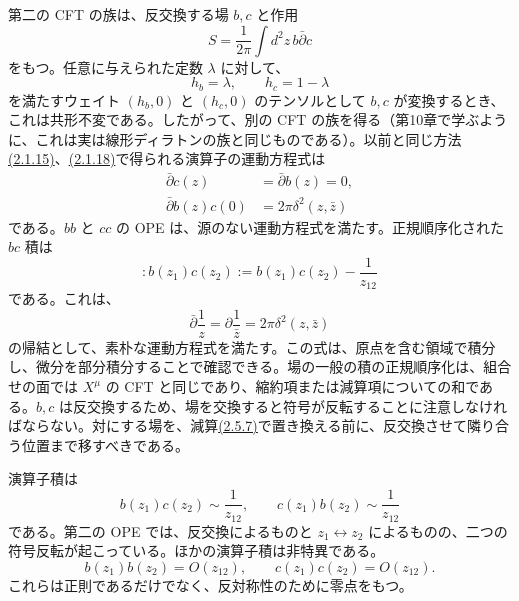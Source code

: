 第二の CFT の族は、反交換する場 $b,c$ と作用
\begin{equation}
S=\frac1{2\pi}\int d^2z\,b\bar\partial c
\tag{2.5.4}\label{eq:2.5.4}
\end{equation}
をもつ。任意に与えられた定数 $\lambda$ に対して、
\begin{equation}
h_b=\lambda,\qquad h_c=1-\lambda
\tag{2.5.5}\label{eq:2.5.5}
\end{equation}
を満たすウェイト $(h_b,0)$ と $(h_c,0)$ のテンソルとして $b,c$ が変換するとき、これは共形不変である。したがって、別の CFT の族を得る（第10章で学ぶように、これは実は線形ディラトンの族と同じものである）。以前と同じ方法\hyperref[eq:2.1.15]{(2.1.15)}、\hyperref[eq:2.1.18]{(2.1.18)}で得られる演算子の運動方程式は
\begin{align}
\bar\partial c(z)&=\bar\partial b(z)=0,
\tag{2.5.6a}\label{eq:2.5.6a}\\
\bar\partial b(z)c(0)&=2\pi\delta^2(z,\bar z)
\tag{2.5.6b}\label{eq:2.5.6b}
\end{align}
である。$bb$ と $cc$ の OPE は、源のない運動方程式を満たす。正規順序化された $bc$ 積は
\begin{equation}
:b(z_1)c(z_2):=b(z_1)c(z_2)-\frac1{z_{12}}
\tag{2.5.7}\label{eq:2.5.7}
\end{equation}
である。これは、
\begin{equation}
\bar\partial\frac1z=\partial\frac1{\bar z}
=2\pi\delta^2(z,\bar z)
\tag{2.5.8}\label{eq:2.5.8}
\end{equation}
の帰結として、素朴な運動方程式を満たす。この式は、原点を含む領域で積分し、微分を部分積分することで確認できる。場の一般の積の正規順序化は、組合せの面では $X^\mu$ の CFT と同じであり、縮約項または減算項についての和である。$b,c$ は反交換するため、場を交換すると符号が反転することに注意しなければならない。対にする場を、減算\hyperref[eq:2.5.7]{(2.5.7)}で置き換える前に、反交換させて隣り合う位置まで移すべきである。

演算子積は
\begin{equation}
b(z_1)c(z_2)\sim\frac1{z_{12}},\qquad
c(z_1)b(z_2)\sim\frac1{z_{12}}
\tag{2.5.9}\label{eq:2.5.9}
\end{equation}
である。第二の OPE では、反交換によるものと $z_1\leftrightarrow z_2$ によるものの、二つの符号反転が起こっている。ほかの演算子積は非特異である。
\begin{equation}
b(z_1)b(z_2)=O(z_{12}),\qquad
c(z_1)c(z_2)=O(z_{12}).
\tag{2.5.10}\label{eq:2.5.10}
\end{equation}
これらは正則であるだけでなく、反対称性のために零点をもつ。

